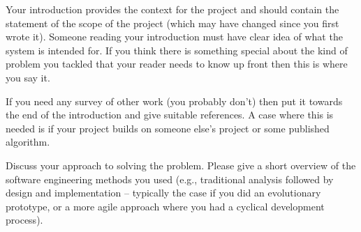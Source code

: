 \newpage
Your introduction provides the context for the project and should
contain the statement of the scope of the project (which may have
changed since you first wrote it). Someone reading your introduction
must have clear idea of what the system is intended for. If you think
there is something special about the kind of problem you tackled that
your reader needs to know up front then this is where you say it.

If you need any survey of other work (you probably don't) then put it
towards the end of the introduction and give suitable references. A
case where this is needed is if your project builds on someone else's
project or some published algorithm.

Discuss your approach to solving the problem. Please give a short
overview of the software engineering methods you used (e.g.,
traditional analysis followed by design and implementation -- typically
the case if you did an evolutionary prototype, or a more agile
approach where you had a cyclical development process). 


